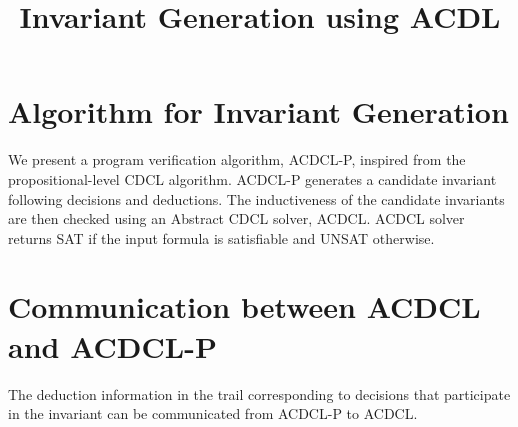 \documentclass[a4paper,conference]{llncs}
\newcommand{\Omit}[1]{}
\begin{document}
\title{Invariant Generation using ACDL}
\author{}
\institute{}

\maketitle 

\section{Algorithm for Invariant Generation}
\Omit{
We propose a two-solver approach for proving programs with loops using ACDL. 
Let us call these solvers: \em{proof solver} (PS) and \em{invariant solver} (IS).
The purpose of proof solver is to determine the safety of the program in the
presence of the negation of assertion. Whereas, the purpose of invariant solver is 
to determine the inductivenss of the candidate invariant produced by the proof 
solver in the presence of the actual assertion.
}
We present a program verification algorithm, ACDCL-P, inspired 
from the propositional-level CDCL algorithm. ACDCL-P generates a candidate 
invariant following decisions and deductions. The inductiveness of the 
candidate invariants are then checked using an Abstract CDCL solver, ACDCL. ACDCL 
solver returns SAT if the input formula is satisfiable and UNSAT otherwise. 

\section{Communication between ACDCL and ACDCL-P}
The deduction information in the trail corresponding to 
decisions that participate in the invariant can be 
communicated from ACDCL-P to ACDCL.  
\end{document}
